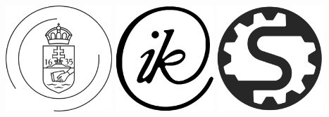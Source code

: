 \hypersetup{pageanchor=false}


\clearpage
\begin{center}
\MakeUppercase{\authorName}\\[0.1cm]
\MakeUppercase{\munkatipus}\\[0.1cm]
\end{center}
\thispagestyle{empty}

\clearpage
\begin{center}

\MakeUppercase{\textbf{\elte}}\\[0.1cm]
\MakeUppercase{\textmd{\ik}}\\[0.1cm]
\MakeUppercase{\textmd{\department}}\\[0.8cm]
\vspace{1cm}
\includegraphics[width=40mm,keepaspectratio]{figures/elte_uj}\hspace{1cm}
\includegraphics[height=40mm,keepaspectratio]{figures/elte_ik_logo}\hspace{1cm}
\includegraphics[height=40mm,keepaspectratio]{figures/smi}\\[0.5cm]
\vspace{1cm}
\MakeUppercase{\munkatipusok}

\end{center}
\thispagestyle{empty}

